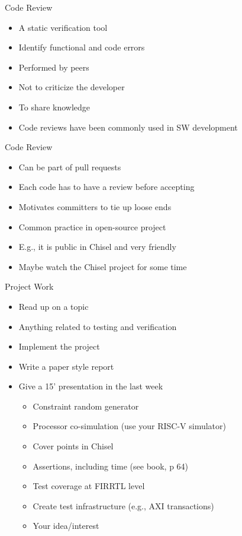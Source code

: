 \begin{frame}[fragile]{Code Review}
\begin{itemize}
\item A static verification tool
\item Identify functional and code errors
\item Performed by peers
\item Not to criticize the developer
\item To share knowledge
\item Code reviews have been commonly used in SW development
\end{itemize}
\end{frame}

\begin{frame}[fragile]{Code Review}
\begin{itemize}
\item Can be part of pull requests
\item Each code has to have a review before accepting
\item Motivates committers to tie up loose ends
\item Common practice in open-source project
\item E.g., it is public in Chisel and very friendly
\item Maybe watch the Chisel project for some time
\end{itemize}
\end{frame}


\begin{frame}[fragile]{Project Work}
\begin{itemize}
\item Read up on a topic
\item Anything related to testing and verification
\item Implement the project
\item Write a paper style report
\item Give a 15' presentation in the last week
\begin{itemize}
\item Constraint random generator
\item Processor co-simulation (use your RISC-V simulator)
\item Cover points in Chisel
\item Assertions, including time (see book, p 64)
\item Test coverage at FIRRTL level
\item Create test infrastructure (e.g., AXI transactions)
\item Your idea/interest
\end{itemize}
\end{itemize}
\end{frame}

